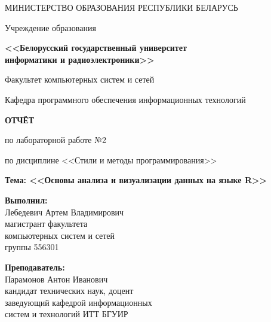 \documentclass[14pt,a4paper]{extarticle}
\begin{document}
\thispagestyle{empty}
\begin{center}
МИНИСТЕРСТВО ОБРАЗОВАНИЯ РЕСПУБЛИКИ БЕЛАРУСЬ

\vspace{0.5em}

Учреждение образования

\textbf{<<Белорусский государственный университет\\информатики и радиоэлектроники>>}

\vspace{2em}

Факультет компьютерных систем и сетей

\vspace{0.5em}

Кафедра программного обеспечения информационных технологий
\end{center}

\vspace{4em}

\begin{center}
\textbf{ОТЧЁТ}

по лабораторной работе №2

\vspace{0.5em}

по дисциплине <<Стили и методы программирования>>

\vspace{1em}

\textbf{Тема: <<Основы анализа и визуализации данных на языке R>>}
\end{center}

\vspace{6em}

\begin{flushright}
\begin{minipage}{0.5\textwidth}
\textbf{Выполнил:}\\
Лебедевич Артем Владимирович\\
магистрант факультета\\
компьютерных систем и сетей\\
группы 556301

\vspace{1em}

\textbf{Преподаватель:}\\
Парамонов Антон Иванович\\
кандидат технических наук, доцент\\
заведующий кафедрой информационных\\
систем и технологий ИТТ БГУИР
\end{minipage}
\end{flushright}
\end{document}
